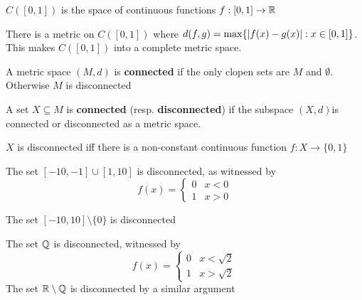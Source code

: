 \documentclass[11pt]{article}
\begin{document}
\begin{definition}[]
\(C([0,1])\) is the space of continuous functions \(f:[0,1]\to\mathbb{R}\)
\end{definition}

\begin{proposition}[]
There is a metric on \(C([0,1])\) where \(d(f,g)=\max\{\abs{f(x)-g(x)}:x\in[0,1]\}\). This
makes \(C([0,1])\) into a complete metric space.
\end{proposition}

\begin{definition}[]
A metric space \((M,d)\) is \textbf{connected} if the only clopen sets are \(M\) and \(\emptyset\).
Otherwise \(M\) is disconnected
\end{definition}

\begin{definition}[]
A set \(X\subseteq M\) is \textbf{connected} (resp. \textbf{disconnected}) if the subspace \((X,d)\)is connected or
disconnected as a metric space.
\end{definition}

\begin{proposition}[]
\(X\) is disconnected iff there is a non-constant continuous function \(f:X\to\{0,1\}\)
\end{proposition}

\begin{examplle}[]
The set \([-10,-1]\cup[1,10]\) is disconnected, as witnessed by
\begin{equation*}
f(x)=
\begin{cases}
0&x<0\\
1&x>0
\end{cases}
\end{equation*}
\end{examplle}

\begin{examplle}[]
The set \([-10,10]\setminus\{0\}\) is disconnected
\end{examplle}

\begin{examplle}[]
The set \(\mathbb{Q}\) is disconnected, witnessed by
\begin{equation*}
f(x)=
\begin{cases}
0&x<\sqrt{2}\\
1&x>\sqrt{2}
\end{cases}
\end{equation*}
The set \(\mathbb{R}\setminus\mathbb{Q}\) is disconnected by a similar argument
\end{examplle}
\end{document}
